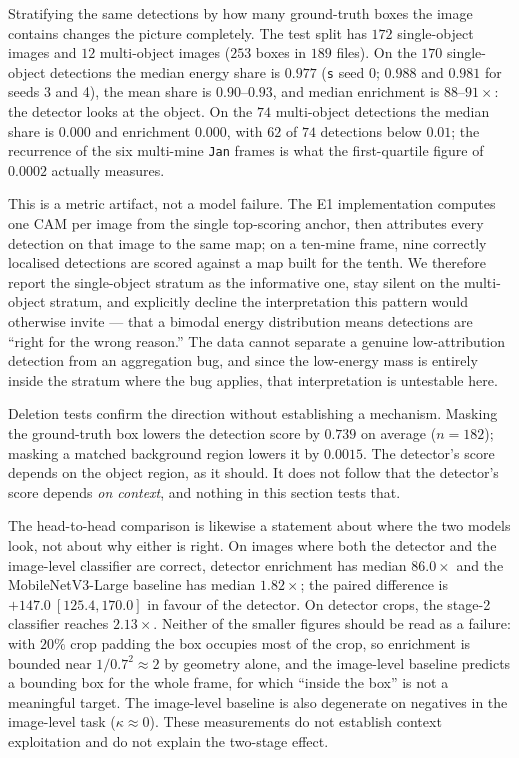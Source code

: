 Stratifying the same detections by how many ground-truth boxes the image contains
changes the picture completely. The test split has $172$ single-object images and
$12$ multi-object images ($253$ boxes in $189$ files). On the $170$
single-object detections the median energy share is $0.977$ (\texttt{s} seed 0;
$0.988$ and $0.981$ for seeds 3 and 4), the mean share is $0.90$--$0.93$, and
median enrichment is $88$--$91\times$: the detector looks at the object. On the
$74$ multi-object detections the median share is $0.000$ and enrichment $0.000$,
with $62$ of $74$ detections below $0.01$; the recurrence of the six multi-mine
\texttt{Jan} frames is what the first-quartile figure of $0.0002$ actually
measures.

This is a metric artifact, not a model failure. The E1 implementation computes
one CAM per image from the single top-scoring anchor, then attributes every
detection on that image to the same map; on a ten-mine frame, nine correctly
localised detections are scored against a map built for the tenth. We therefore
report the single-object stratum as the informative one, stay silent on the
multi-object stratum, and explicitly decline the interpretation this
pattern would otherwise invite --- that a bimodal energy distribution means
detections are ``right for the wrong reason.'' The data cannot separate a genuine
low-attribution detection from an aggregation bug, and since the low-energy mass
is entirely inside the stratum where the bug applies, that interpretation is
untestable here.

Deletion tests confirm the direction without establishing a mechanism. Masking the
ground-truth box lowers the detection score by $0.739$ on average ($n=182$);
masking a matched background region lowers it by $0.0015$. The detector's score
depends on the object region, as it should. It does not follow that the detector's
score depends \emph{on context}, and nothing in this section tests that.

The head-to-head comparison is likewise a statement about where the two models
look, not about why either is right. On images where both the detector and the
image-level classifier are correct, detector enrichment has median $86.0\times$
and the MobileNetV3-Large baseline has median $1.82\times$; the paired difference
is $+147.0\ [125.4, 170.0]$ in favour of the detector. On detector crops, the
stage-2 classifier reaches $2.13\times$. Neither of the smaller figures should be
read as a failure: with $20\%$ crop padding the box occupies most of the crop, so
enrichment is bounded near $1/0.7^{2}\approx2$ by geometry alone, and the
image-level baseline predicts a bounding box for the whole frame, for which
``inside the box'' is not a meaningful target. The image-level baseline is also
degenerate on negatives in the image-level task ($\kappa\approx0$). These
measurements do not establish context exploitation and do not explain the
two-stage effect.

